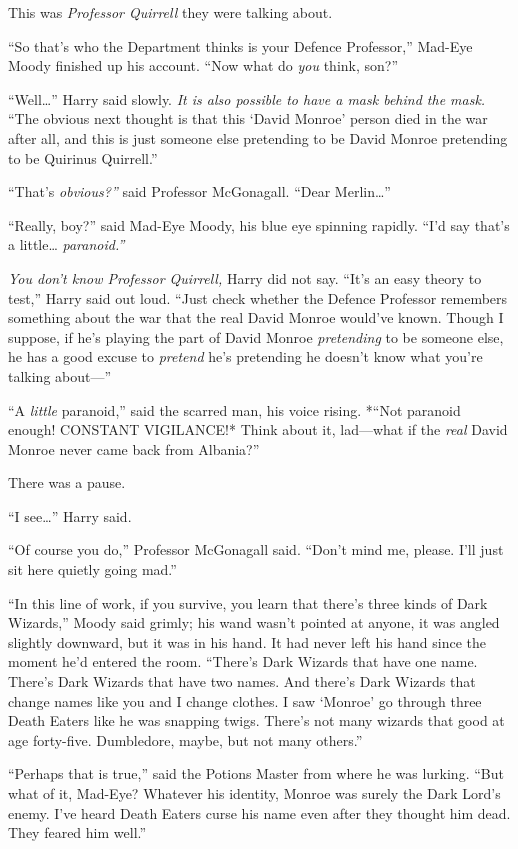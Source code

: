 This was \emph{Professor Quirrell} they were talking about.

``So that's who the Department thinks is your Defence Professor,''
Mad-Eye Moody finished up his account. ``Now what do \emph{you} think,
son?''

``Well\ldots{}'' Harry said slowly. \emph{It is also possible to have a
mask behind the mask.} ``The obvious next thought is that this `David
Monroe' person died in the war after all, and this is just someone else
pretending to be David Monroe pretending to be Quirinus Quirrell.''

``That's \emph{obvious?''} said Professor McGonagall. ``Dear
Merlin\ldots{}''

``Really, boy?'' said Mad-Eye Moody, his blue eye spinning rapidly.
``I'd say that's a little\ldots{} \emph{paranoid.''}

\emph{You don't know Professor Quirrell,} Harry did not say. ``It's an
easy theory to test,'' Harry said out loud. ``Just check whether the
Defence Professor remembers something about the war that the real David
Monroe would've known. Though I suppose, if he's playing the part of
David Monroe \emph{pretending} to be someone else, he has a good excuse
to \emph{pretend} he's pretending he doesn't know what you're talking
about---''

``A \emph{little} paranoid,'' said the scarred man, his voice rising.
*``Not paranoid enough! CONSTANT VIGILANCE!* Think about it, lad---what
if the \emph{real} David Monroe never came back from Albania?''

There was a pause.

``I see\ldots{}'' Harry said.

``Of course you do,'' Professor McGonagall said. ``Don't mind me,
please. I'll just sit here quietly going mad.''

``In this line of work, if you survive, you learn that there's three
kinds of Dark Wizards,'' Moody said grimly; his wand wasn't pointed at
anyone, it was angled slightly downward, but it was in his hand. It had
never left his hand since the moment he'd entered the room. ``There's
Dark Wizards that have one name. There's Dark Wizards that have two
names. And there's Dark Wizards that change names like you and I change
clothes. I saw `Monroe' go through three Death Eaters like he was
snapping twigs. There's not many wizards that good at age forty-five.
Dumbledore, maybe, but not many others.''

``Perhaps that is true,'' said the Potions Master from where he was
lurking. ``But what of it, Mad-Eye? Whatever his identity, Monroe was
surely the Dark Lord's enemy. I've heard Death Eaters curse his name
even after they thought him dead. They feared him well.''

